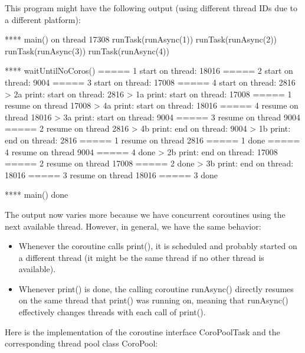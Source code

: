 This program might have the following output (using different thread IDs due to a different platform):

\begin{shell}
**** main() on thread 17308
runTask(runAsync(1))
runTask(runAsync(2))
runTask(runAsync(3))
runTask(runAsync(4))

**** waitUntilNoCoros()
===== 1 start on thread: 18016
===== 2 start on thread: 9004
===== 3 start on thread: 17008
===== 4 start on thread: 2816
    > 2a print: start on thread: 2816
    > 1a print: start on thread: 17008
===== 1 resume on thread 17008
    > 4a print: start on thread: 18016
===== 4 resume on thread 18016
    > 3a print: start on thread: 9004
===== 3 resume on thread 9004
===== 2 resume on thread 2816
    > 4b print: end on thread: 9004
    > 1b print: end on thread: 2816
===== 1 resume on thread 2816
===== 1 done
===== 4 resume on thread 9004
===== 4 done
    > 2b print: end on thread: 17008
===== 2 resume on thread 17008
===== 2 done
    > 3b print: end on thread: 18016
===== 3 resume on thread 18016
===== 3 done

**** main() done
\end{shell}

The output now varies more because we have concurrent coroutines using the next available thread. However, in general, we have the same behavior:

\begin{itemize}
\item 
Whenever the coroutine calls print(), it is scheduled and probably started on a different thread (it might be the same thread if no other thread is available).

\item 
Whenever print() is done, the calling coroutine runAsync() directly resumes on the same thread that print() was running on, meaning that runAsync() effectively changes threads with each call of print().
\end{itemize}


Here is the implementation of the coroutine interface CoroPoolTask and the corresponding thread pool class CoroPool:


